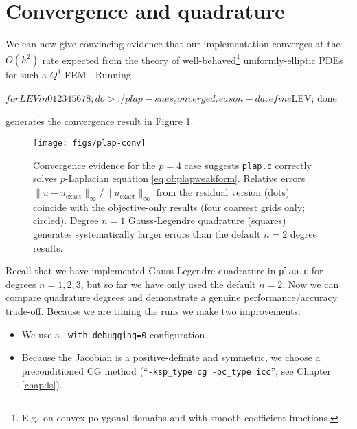 \section{Convergence and quadrature}

We can now give convincing evidence that our implementation converges at the $O(h^2)$ rate expected from the theory of well-behaved\footnote{E.g.~on convex polygonal domains and with smooth coefficient functions.} uniformly-elliptic PDEs for such a $Q^1$ FEM \citep{Elmanetal2005}.  Running
\begin{cline}
$ for LEV in 0 1 2 3 4 5 6 7 8; do
> ./plap -snes_converged_reason -da_refine $LEV; done
\end{cline}
generates the convergence result in Figure \ref{fig:of:plap-conv}.

\begin{figure}
\texttt{[image: figs/plap-conv]}
\caption{Convergence evidence for the $p=4$ case suggests \texttt{plap.c} correctly solves $p$-Laplacian equation \eqref{eq:of:plapweakform}.  Relative errors $\|u-u_{\text{exact}}\|_\infty / \|u_{\text{exact}}\|_\infty$ from the residual version (dots) coincide with the objective-only results (four coarsest grids only; circled).  Degree $n=1$ Gauss-Legendre quadrature (squares) generates systematically larger errors than the default $n=2$ degree results.}
\label{fig:of:plap-conv}
\end{figure}

Recall that we have implemented Gauss-Legendre quadrature in \texttt{plap.c} for degrees $n=1,2,3$, but so far we have only used the default $n=2$.  Now we can compare quadrature degrees and demonstrate a genuine performance/accuracy trade-off.  Because we are timing the runs we make two improvements:
\begin{itemize}
\item We use a \texttt{--with-debugging=0} \PETSc configuration.
\item Because the Jacobian is a positive-definite and symmetric, we choose a preconditioned CG method (``\texttt{-ksp\_type cg -pc\_type icc}''; see Chapter \ref{chap:ls}).
\end{itemize}

